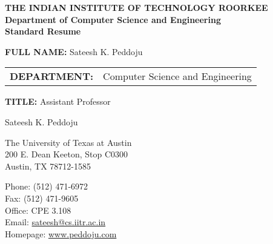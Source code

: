 \documentclass[12pt,letterpaper]{article}
\makeatletter
\let\saved@bibitem\@bibitem %
\def\HCode#1{}
\def\name{Sateesh K. Peddoju}
\makeatother
\begin{document}
\sloppy

\begingroup
\makeatletter
\let\@bibitem\saved@bibitem %
\endgroup

\ifdefined\iscockrell
\begin{center}
    \textbf{THE INDIAN INSTITUTE OF TECHNOLOGY ROORKEE\\ Department of Computer Science and Engineering \\ Standard Resume}
\end{center}

\bigskip

\begin{minipage}[t]{0.7\textwidth}
    \textbf{\large FULL NAME:} Sateesh K. Peddoju \\

    \begin{tabular}{@{}ll}
        \textbf{\large DEPARTMENT:} & Computer Science and Engineering
    \end{tabular}
\end{minipage}
\begin{minipage}[t]{0.3\textwidth}
    \textbf{\large TITLE:} Assistant Professor
\end{minipage}
\else
\HCode{<div class="fluid-container"}

\HCode{<div class="row">}
\HCode{<div class="col-md-12">}
\HCode{<h1>}
{\huge \name}
\HCode{</h1>}
\HCode{</div>} %
\HCode{</div>} %

\bigskip

\HCode{<div class="row">}
\HCode{<div class="col-md-4">}
\begin{minipage}[t]{0.5\textwidth}
  The University of Texas at Austin \\
  200 E. Dean Keeton, Stop C0300 \\
  Austin, TX 78712-1585 \\
\end{minipage}
\HCode{</div>} %
\HCode{<div class="col-md-8">}
\begin{minipage}[t]{0.5\textwidth}
  Phone: (512) 471-6972 \\
  Fax: (512) 471-9605 \\
  Office: CPE 3.108 \\
\ifdefined\ispdf
  Email: \href{mailto:sateesh@ieee.org}{sateesh@cs.iitr.ac.in} \\
\fi
  Homepage: \href{faculty.iitr.ac.in/~drpskfec}{www.peddoju.com}
\end{minipage}
\HCode{</div>} %
\HCode{</div>} %
\end{document}
